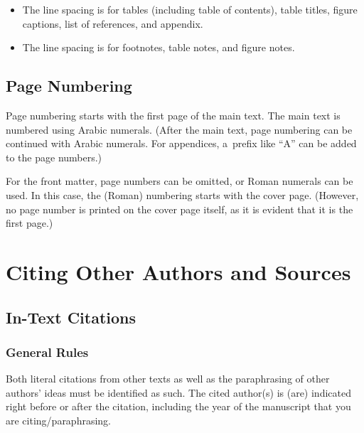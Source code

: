 \documentclass[12pt, a4paper, oneside]{article}
\newlength{\baselinedist}
\newlength{\smalllinespacing}
\newlength{\footnotelinespacing}
\theoremstyle{Plain}
\theoremstyle{Definition}
\theoremstyle{Remark}
\begin{document}
\begin{itemize}
\begin{itemize}
			\item Level-4 headings (\verb|\paragraph|) are spaced \makeatletter\SI[round-mode = places, round-precision = 2]{\strip@pt\baselinedistHalf}{pt}\makeatother\ above and 0~pt below. (Level-4 headings are usually unnecessary in documents that have the scope of theses.)
		\end{itemize}
	\item The line spacing is \printlength{\smalllinespacing} for tables (including table of contents), table titles, figure captions, list of references, and appendix.
	\item The line spacing is \printlength{\footnotelinespacing} for footnotes, table notes, and figure notes.
\end{itemize}

\subsection{Page Numbering}

Page numbering starts with the first page of the main text. The main text is numbered using Arabic numerals. (After the main text, page numbering can be continued with Arabic numerals. For appendices, a~prefix like ``A'' can be added to the page numbers.)

For the front matter, page numbers can be omitted, or Roman numerals can be used. In this case, the (Roman) numbering starts with the cover page. (However, no page number is printed on the cover page itself, as it is evident that it is the first page.)


\section{Citing Other Authors and Sources}
\label{sec:citations}

\subsection{In-Text Citations}

\subsubsection{General Rules}

Both literal citations from other texts as well as the paraphrasing of other authors' ideas must be identified as such. The cited author(s) is (are) indicated right before or after the citation, including the year of the manuscript that you are citing/paraphrasing.
\end{document}
